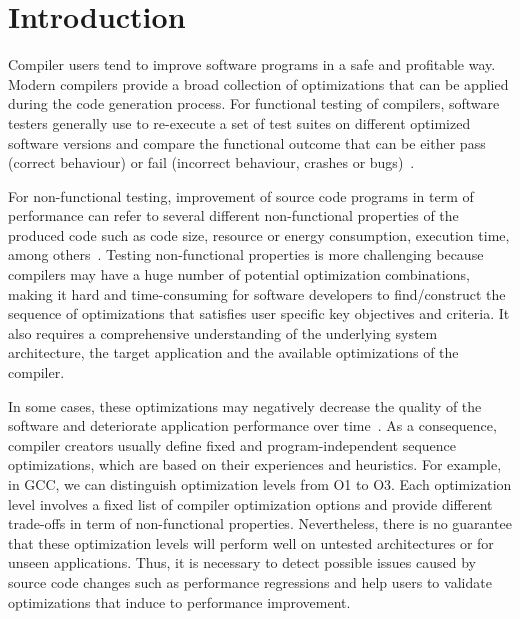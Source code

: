 \section{Introduction}
Compiler users tend to improve software programs in a safe and profitable way. Modern compilers provide a broad collection of optimizations that can be applied during the code generation process. 
For functional testing of compilers, software testers generally use to re-execute a set of test suites on different optimized software versions and compare the functional outcome that can be either pass (correct behaviour) or fail (incorrect behaviour, crashes or bugs)~\cite{hoste2008cole,le2014compiler}. 

For non-functional testing, improvement of source code programs in term of performance can refer to several different non-functional properties of the produced code such as code size, resource or energy consumption, execution time, among others~\cite{almagor2004finding,pan2006fast}.
Testing non-functional properties is more challenging because compilers may have a huge number of potential optimization combinations, making it hard and time-consuming for software developers to find/construct the sequence of optimizations that satisfies user specific key objectives and criteria. It also requires a comprehensive understanding of the underlying system architecture, the target application and the available optimizations of the compiler.

In some cases, these optimizations may negatively decrease the quality of the software and deteriorate application performance over time~\cite{molyneaux2009art}. 
As a consequence, compiler creators usually define fixed and program-independent sequence optimizations, which are based on their experiences and heuristics. For example, in GCC, we can distinguish optimization levels from O1 to O3. Each optimization level involves a fixed list of compiler optimization options and provide different trade-offs in term of non-functional properties.
Nevertheless, there is no guarantee that these optimization levels will perform well on untested architectures or for unseen applications. 
Thus, it is necessary to detect possible issues caused by source code changes such as performance regressions and help users to validate optimizations that induce to performance improvement.

